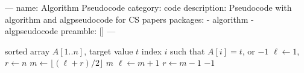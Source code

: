 ---
name: Algorithm Pseudocode
category: code
description: Pseudocode with algorithm and algpseudocode for CS papers
packages:
  - algorithm
  - algpseudocode
preamble: []
---
\begin{algorithm}[htbp]
\caption{Binary Search}\label{alg:binsearch}
\begin{algorithmic}[1]
  \Require sorted array $A[1..n]$, target value $t$
  \Ensure index $i$ such that $A[i] = t$, or $-1$
  \State $\ell \gets 1$, $r \gets n$
    \State $m \gets \lfloor (\ell + r) / 2 \rfloor$
      \State \Return $m$
      \State $\ell \gets m + 1$
    \Else
      \State $r \gets m - 1$
    \EndIf
  \EndWhile
  \State \Return $-1$
\end{algorithmic}
\end{algorithm}
